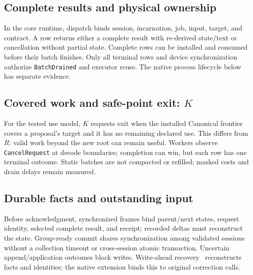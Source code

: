 \subsection{Complete results and physical ownership}
In the core runtime, dispatch binds session,
incarnation, job, input, target, and contract. A row returns either a
complete result with re-derived state/text or cancellation without partial
state. Complete rows can be installed and consumed before their batch
finishes. Only all terminal rows and device synchronization authorize
\texttt{BatchDrained} and executor reuse. The native process lifecycle
below has separate evidence.

\subsection{Covered work and safe-point exit: \texorpdfstring{$K$}{K}}
For the tested use model, $K$ requests exit when the installed Canonical
frontier covers a proposal's target and it has no remaining declared use.
This differs from $R$: valid work beyond the new root can remain useful.
Workers observe \texttt{CancelRequest} at decode boundaries; completion
can win, but each row has one terminal outcome. Static batches are not
compacted or refilled; masked costs and drain delays remain measured.

\subsection{Durable facts and outstanding input}
Before acknowledgment, synchronized frames bind parent/next states,
request identity, selected complete result, and receipt; recorded deltas
must reconstruct the state. Group-ready commit shares synchronization
among validated sessions without a collection timeout or cross-session
atomic transaction. Uncertain append/application outcomes block writes.
Write-ahead recovery~\cite{mohan1992aries} reconstructs facts and identities;
the native extension binds this to original correction calls.

